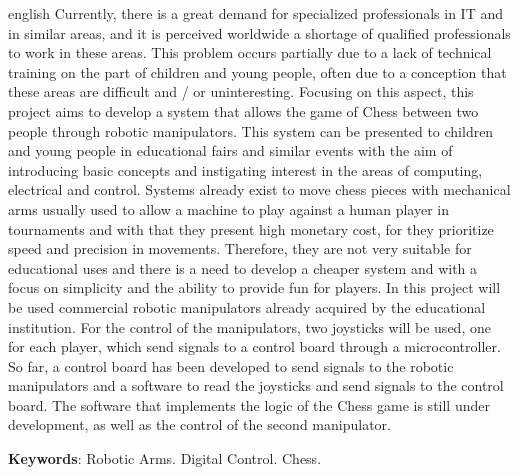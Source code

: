 \begin{resumo}[Abstract]
 \begin{otherlanguage*}{english}
  Currently, there is a great demand for specialized professionals in IT and in similar areas, and it is perceived worldwide a shortage of qualified professionals to work in these areas.
  This problem occurs partially due to a lack of technical training on the part of children and young people, often due to a conception that these areas are difficult and / or uninteresting.
  Focusing on this aspect, this project aims to develop a system that allows the game of Chess between two people through robotic manipulators.
  This system can be presented to children and young people in educational fairs and similar events with the aim of introducing basic concepts and instigating interest in the areas of computing, electrical and control.
  Systems already exist to move chess pieces with mechanical arms usually used to allow a machine to play against a human player in tournaments and with that they present high monetary cost, for they prioritize speed and precision in movements.
  Therefore, they are not very suitable for educational uses and there is a need to develop a cheaper system and with a focus on simplicity and the ability to provide fun for players.
  In this project will be used commercial robotic manipulators already acquired by the educational institution.
  For the control of the manipulators, two joysticks will be used, one for each player, which send signals to a control board through a microcontroller.
  So far, a control board has been developed to send signals to the robotic manipulators and a software to read the joysticks and send signals to the control board.
  The software that implements the logic of the Chess game is still under development, as well as the control of the second manipulator.

   \vspace{\onelineskip}
 
   \noindent 
   \textbf{Keywords}: Robotic Arms. Digital Control. Chess.
 \end{otherlanguage*}
\end{resumo}



\listoffigures*
\cleardoublepage

\listoftables*
\cleardoublepage

